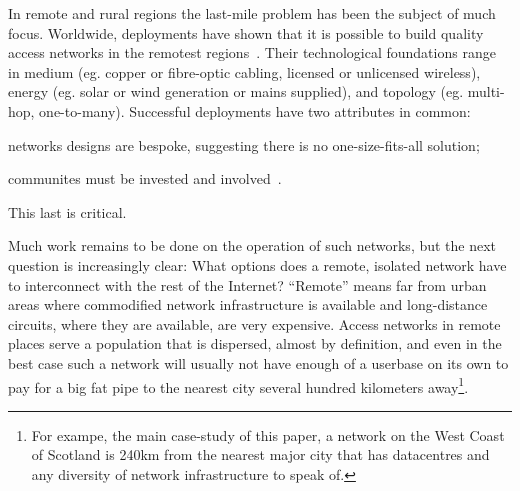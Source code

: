 In remote and rural regions the last-mile problem has been the subject of much
focus. Worldwide, deployments have shown that it is possible to build quality
access networks in the remotest regions~\cite{xxx}. Their technological
foundations range in medium (eg. copper or fibre-optic cabling, licensed
or unlicensed wireless), energy (eg. solar or wind generation or
mains supplied), and topology (eg. multi-hop,
one-to-many). Successful deployments
have two attributes in common:
\begin{inparaenum}[(i)]
  \item networks designs are bespoke, suggesting
    there is no one-size-fits-all solution;
  \item communites must be invested and involved~\cite{Wallace:2015a,
    Wallace2015b}.
\end{inparaenum}
This last is critical.

Much work remains to be done on the operation of such networks, but
the next question is increasingly clear: What options does a remote,
isolated network have to interconnect with the rest of the Internet?
``Remote'' means far from urban areas where commodified network
infrastructure is available and long-distance circuits, where they are
available, are very expensive. Access networks in remote places serve
a population that is dispersed, almost by definition, and even in the
best case such a network will usually not have enough of a userbase on
its own to pay for a big fat pipe to the nearest city several hundred
kilometers away\footnote{For exampe, the main case-study of this
paper, a network on the West Coast of Scotland is 240km from the
nearest major city that has datacentres and any diversity of network
infrastructure to speak of.}.


